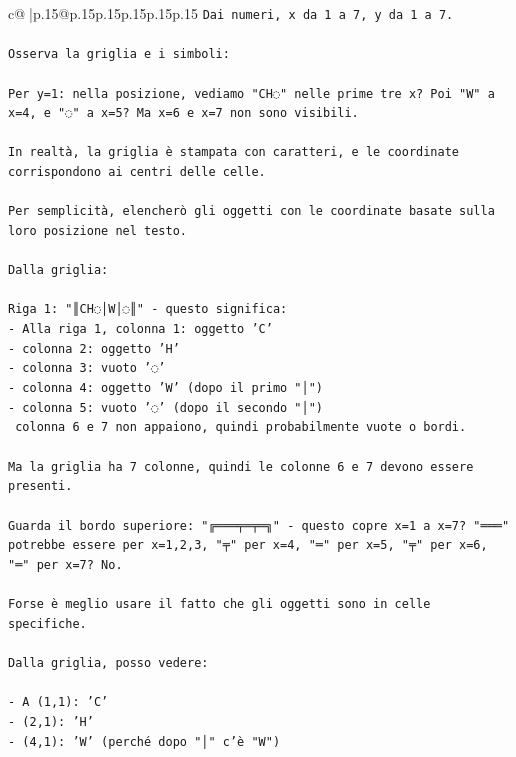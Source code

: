 \documentclass{article}
\begin{document}
{\begin{supertabular}{c@{$\;$}|p{.15\linewidth}@{}p{.15\linewidth}p{.15\linewidth}p{.15\linewidth}p{.15\linewidth}p{.15\linewidth}}
{{{\texttt{Dai numeri, x da 1 a 7, y da 1 a 7.} \\
\\ 
\texttt{Osserva la griglia e i simboli:} \\
\\ 
\texttt{Per y=1: nella posizione, vediamo "CH◌" nelle prime tre x? Poi "W" a x=4, e "◌" a x=5? Ma x=6 e x=7 non sono visibili.} \\
\\ 
\texttt{In realtà, la griglia è stampata con caratteri, e le coordinate corrispondono ai centri delle celle.} \\
\\ 
\texttt{Per semplicità, elencherò gli oggetti con le coordinate basate sulla loro posizione nel testo.} \\
\\ 
\texttt{Dalla griglia:} \\
\\ 
\texttt{Riga 1: "║CH◌│W│◌║" {-} questo significa:} \\
\texttt{{-} Alla riga 1, colonna 1: oggetto 'C'} \\
\texttt{{-} colonna 2: oggetto 'H'} \\
\texttt{{-} colonna 3: vuoto '◌'} \\
\texttt{{-} colonna 4: oggetto 'W' (dopo il primo "│")} \\
\texttt{{-} colonna 5: vuoto '◌' (dopo il secondo "│")} \\
\texttt{ colonna 6 e 7 non appaiono, quindi probabilmente vuote o bordi.} \\
\\ 
\texttt{Ma la griglia ha 7 colonne, quindi le colonne 6 e 7 devono essere presenti.} \\
\\ 
\texttt{Guarda il bordo superiore: "╔═══╤═╤═╗" {-} questo copre x=1 a x=7? "═══" potrebbe essere per x=1,2,3, "╤" per x=4, "═" per x=5, "╤" per x=6, "═" per x=7? No.} \\
\\ 
\texttt{Forse è meglio usare il fatto che gli oggetti sono in celle specifiche.} \\
\\ 
\texttt{Dalla griglia, posso vedere:} \\
\\ 
\texttt{{-} A (1,1): 'C'} \\
\texttt{{-} (2,1): 'H'} \\
\texttt{{-} (4,1): 'W'  (perché dopo "│" c'è "W")} \\
}}}
\end{supertabular}}
\end{document}
